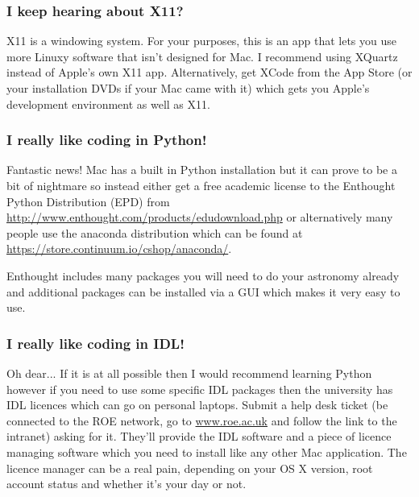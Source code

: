 \subsubsection{I keep hearing about X11?}
X11 is a windowing system. For your purposes, this is an app that lets you use more Linuxy software that isn't designed for Mac.
I recommend using XQuartz instead of Apple's own X11 app.
Alternatively, get XCode from the App Store (or your installation DVDs if your Mac came with it) which gets you Apple's development environment as well as X11.

\subsubsection{I really like coding in Python!}
Fantastic news! Mac has a built in Python installation but it can prove to be a bit of nightmare so instead either get a free academic license to the Enthought Python Distribution (EPD) from \url{http://www.enthought.com/products/edudownload.php} or alternatively many people use the anaconda distribution which can be found at  \url{https://store.continuum.io/cshop/anaconda/}.

Enthought includes many packages you will need to do your astronomy already and additional packages can be installed via a GUI which makes it very easy to use.

\subsubsection{I really like coding in IDL!}
Oh dear... If it is at all possible then I would recommend learning Python however if you need to use some specific IDL packages then the university has IDL licences which can go on personal laptops.
Submit a help desk ticket (be connected to the ROE network, go to \url{www.roe.ac.uk} and follow the link to the intranet) asking for it. They'll provide the IDL software and a piece of licence managing software which you need to install like any other Mac application. The licence manager can be a real pain, depending on your OS X version, root account status and whether it's your day or not.

